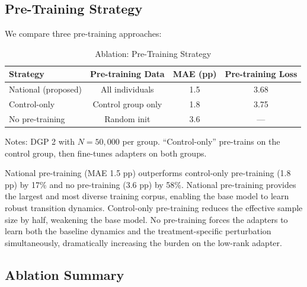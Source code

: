 \documentclass[12pt]{article}
\begin{document}
\subsection{Pre-Training Strategy}

We compare three pre-training approaches:

\begin{table}[H]
\centering
\caption{Ablation: Pre-Training Strategy}
\label{tab:ablation_pretrain}
\begin{threeparttable}
\begin{tabular}{lccc}
\toprule
Strategy & Pre-training Data & MAE (pp) & Pre-training Loss \\
\midrule
National (proposed) & All individuals & 1.5 & 3.68 \\
Control-only & Control group only & 1.8 & 3.75 \\
No pre-training & Random init & 3.6 & --- \\
\bottomrule
\end{tabular}
\begin{tablenotes}[flushleft]
\small
\item Notes: DGP 2 with $N = 50,000$ per group. ``Control-only'' pre-trains on the control group, then fine-tunes adapters on both groups.
\end{tablenotes}
\end{threeparttable}
\end{table}

National pre-training (MAE 1.5 pp) outperforms control-only pre-training (1.8 pp) by 17\% and no pre-training (3.6 pp) by 58\%. National pre-training provides the largest and most diverse training corpus, enabling the base model to learn robust transition dynamics. Control-only pre-training reduces the effective sample size by half, weakening the base model. No pre-training forces the adapters to learn both the baseline dynamics and the treatment-specific perturbation simultaneously, dramatically increasing the burden on the low-rank adapter.

\subsection{Ablation Summary}
\end{document}
